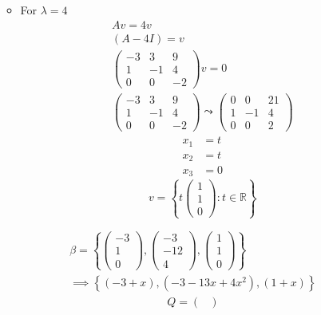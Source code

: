\begin{enumerate}
\begin{itemize}
\begin{equation}
\end{equation}
\item For $\lambda = 4$
\begin{gather}
Av =4v\\
(A -4I)= v\\
\begin{pmatrix}
-3 & 3 & 9\\
1 & -1 & 4\\
0 & 0 & -2
\end{pmatrix}v =0\\
\begin{pmatrix}
-3 & 3 & 9\\
1 & -1 & 4\\
0 & 0 & -2
\end{pmatrix}
\leadsto
\begin{pmatrix}
0 & 0 & 21\\
1 & -1 & 4\\
0 & 0 & 2
\end{pmatrix}
\end{gather}
\begin{align}
x_1 &= t\\
x_2 &= t\\
x_3 &= 0
\end{align}
\begin{equation}
v = \left\{t\begin{pmatrix}1\\1\\0\end{pmatrix} \colon t \in \mathbb{R}\right\}
\end{equation}
\end{itemize}
\begin{gather}
\beta=
\left\{\begin{pmatrix}-3\\1\\0\end{pmatrix},\begin{pmatrix}-3\\-12\\4\end{pmatrix},\begin{pmatrix}1\\1\\0\end{pmatrix}\right\}\\
\implies \left\{(-3+x),(-3-13x+4x^2),(1+x)\right\}
\end{gather}
\begin{gather}
Q = \begin{pmatrix}

\end{pmatrix}
\end{gather}
\end{enumerate}
